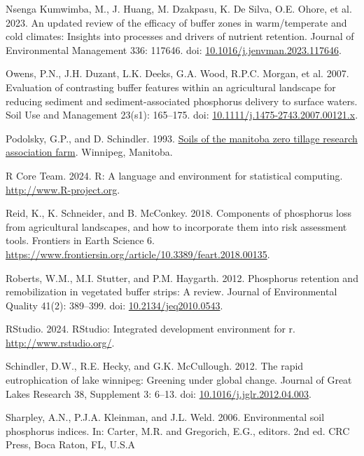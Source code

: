 \documentclass[
]{agujournal2019}
\newlength{\cslhangindent}
\newenvironment{CSLReferences}[2] %
 {\begin{list}{}{%
  \setlength{\itemindent}{0pt}
  \setlength{\leftmargin}{0pt}
  \setlength{\parsep}{0pt}
  \ifodd #1
   \setlength{\leftmargin}{\cslhangindent}
   \setlength{\itemindent}{-1\cslhangindent}
  \fi
  \setlength{\itemsep}{#2\baselineskip}}}
 {\end{list}}
\begin{document}
\begin{CSLReferences}{1}{1}
Nsenga Kumwimba, M., J. Huang, M. Dzakpasu, K. De Silva, O.E. Ohore, et
al. 2023. An updated review of the efficacy of buffer zones in
warm/temperate and cold climates: Insights into processes and drivers of
nutrient retention. Journal of Environmental Management 336: 117646.
doi:
\href{https://doi.org/10.1016/j.jenvman.2023.117646}{10.1016/j.jenvman.2023.117646}.

Owens, P.N., J.H. Duzant, L.K. Deeks, G.A. Wood, R.P.C. Morgan, et al.
2007. Evaluation of contrasting buffer features within an agricultural
landscape for reducing sediment and sediment-associated phosphorus
delivery to surface waters. Soil Use and Management 23(s1): 165--175.
doi:
\href{https://doi.org/10.1111/j.1475-2743.2007.00121.x}{10.1111/j.1475-2743.2007.00121.x}.

Podolsky, G.P., and D. Schindler. 1993.
\href{https://www.manitoba.ca/agriculture/soil/soil-survey/pubs/fss02s00943.pdf}{Soils
of the manitoba zero tillage research association farm}. Winnipeg,
Manitoba.

R Core Team. 2024. R: A language and environment for statistical
computing. \url{http://www.R-project.org}.

Reid, K., K. Schneider, and B. McConkey. 2018. Components of phosphorus
loss from agricultural landscapes, and how to incorporate them into risk
assessment tools. Frontiers in Earth Science 6.
\url{https://www.frontiersin.org/article/10.3389/feart.2018.00135}.

Roberts, W.M., M.I. Stutter, and P.M. Haygarth. 2012. Phosphorus
retention and remobilization in vegetated buffer strips: A review.
Journal of Environmental Quality 41(2): 389--399. doi:
\href{https://doi.org/10.2134/jeq2010.0543}{10.2134/jeq2010.0543}.

RStudio. 2024. RStudio: Integrated development environment for r.
\url{http://www.rstudio.org/}.

Schindler, D.W., R.E. Hecky, and G.K. McCullough. 2012. The rapid
eutrophication of lake winnipeg: Greening under global change. Journal
of Great Lakes Research 38, Supplement 3: 6--13. doi:
\href{https://doi.org/10.1016/j.jglr.2012.04.003}{10.1016/j.jglr.2012.04.003}.

Sharpley, A.N., P.J.A. Kleinman, and J.L. Weld. 2006. Environmental soil
phosphorus indices. In: Carter, M.R. and Gregorich, E.G., editors. 2nd
ed. CRC Press, Boca Raton, FL, U.S.A


\end{CSLReferences}
\end{document}
